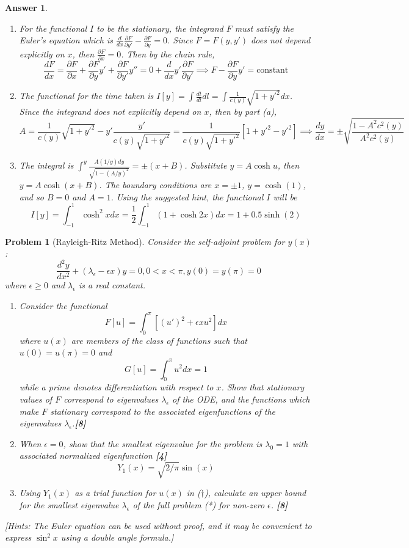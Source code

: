 \documentclass[a4paper]{article}
\newtheorem{ans}{Answer}[section]
\theoremstyle{new}
\newtheorem{qns}{Problem}[section]
\begin{document}
\begin{ans}\leavevmode
\begin{enumerate}[label=(\alph*)]
\item For the functional $I$ to be the stationary, the integrand $F$ must satisfy the Euler's equation which is $\frac{d}{dx}\frac{\partial F}{\partial y'}-\frac{\partial F}{\partial y}=0$. Since $F=F(y,y')$ does not depend explicitly on $x$, then $\frac{\partial F}{\partial x}=0$. Then by the chain rule,
$$\frac{dF}{dx}=\frac{\partial F}{\partial x}+\frac{\partial F}{\partial y}y'+\frac{\partial F}{\partial y'}y''=0+\frac{d}{dx}y'\frac{\partial F}{\partial y'}\implies F-\frac{\partial F}{\partial y}y'=\text{constant}$$
\item The functional for the time taken is $I[y]=\int\frac{dt}{dl}dl=\int\frac{1}{c(y)}\sqrt{1+y'^2}dx$. Since the integrand does not explicitly depend on $x$, then by part (a),
$$A=\frac{1}{c(y)}\sqrt{1+y'^2}-y'\frac{y'}{c(y)\sqrt{1+y'^2}}=\frac{1}{c(y)\sqrt{1+y'^2}}[1+y'^2-y'^2]\implies\frac{dy}{dx}=\pm\sqrt{\frac{1-A^2c^2(y)}{A^2c^2(y)}}$$
\item The integral is $\int^y\frac{A(1/y)dy}{\sqrt{1-(A/y)^2}}=\pm(x+B)$.  Substitute $y=A\cosh u$, then $y=A\cosh(x+B)$. The boundary conditions are $x=\pm1$, $y=\cosh(1)$, and so $B=0$ and $A=1$. Using the suggested hint, the functional $I$ will be
$$I[y]=\int_{-1}^1\cosh^2xdx=\frac{1}{2}\int_{-1}^1(1+\cosh 2x)dx=1+0.5\sinh(2)$$
\end{enumerate}
\end{ans}
\newpage
\begin{qns}[Rayleigh-Ritz Method]
Consider the self-adjoint problem for $y(x)$:
\begin{equation}
   \frac{d^2y}{dx^2}+(\lambda_\epsilon-\epsilon x)y=0,0<x<\pi,y(0)=y(\pi)=0\tag{*}
\end{equation}
where $\epsilon\geq0$ and $\lambda_\epsilon$ is a real constant.
\begin{enumerate}[label=(\alph*)]
\item Consider the functional
\begin{equation}F[u]=\int_0^\pi[(u')^2+\epsilon xu^2]dx\tag{\dag}
\end{equation}
where $u(x)$ are members of the class of functions such that $u(0)=u(\pi)=0$ and
$$G[u]=\int_0^\pi u^2dx=1$$
while a prime denotes differentiation with respect to $x$. Show that stationary values of $F$ correspond to eigenvalues $\lambda_\epsilon$ of the ODE, and the functions which make $F$ stationary correspond to the associated eigenfunctions of the eigenvalues $\lambda_\epsilon$.\hfill \textbf{[8]}
\item When $\epsilon=0$, show that the smallest eigenvalue for the problem is $\lambda_0=1$ with associated normalized eigenfunction \hfill \textbf{[4]} $$Y_1(x)=\sqrt{2/\pi}\sin(x)$$
\item Using $Y_1(x)$ as a trial function for $u(x)$ in ($\dag$), calculate an upper bound for the smallest eigenvalue $\lambda_\epsilon$ of the full problem (*) for non-zero $\epsilon$. \hfill \textbf{[8]}
\end{enumerate}
[Hints: The Euler equation can be used without proof, and it may be convenient to express $\sin^2 x$ using a double angle formula.]
\end{qns}
\end{document}
